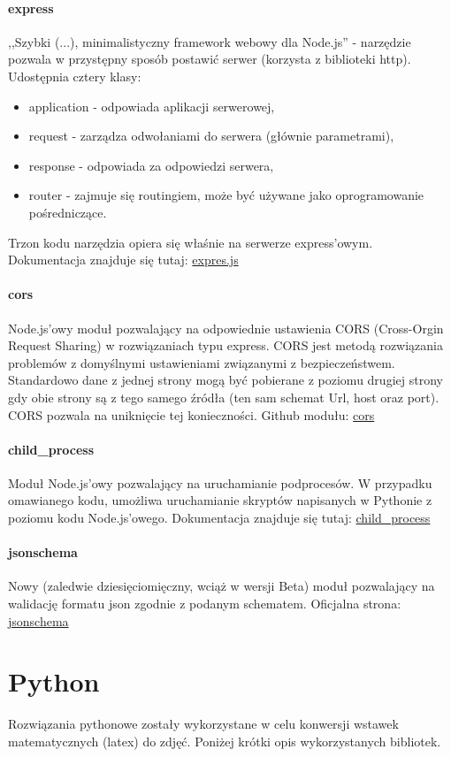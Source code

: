 \paragraph{express}
,,Szybki (...), minimalistyczny framework webowy dla Node.js'' - narzędzie pozwala w przystępny sposób postawić serwer (korzysta z biblioteki http). Udostępnia cztery klasy:
\begin{itemize}
\item application - odpowiada aplikacji serwerowej,
\item  request - zarządza odwołaniami do serwera (głównie parametrami),
\item response - odpowiada za odpowiedzi serwera,
\item router - zajmuje się routingiem, może być używane jako oprogramowanie pośredniczące.
\end{itemize}
Trzon kodu narzędzia opiera się właśnie na serwerze express'owym.
\ind Dokumentacja znajduje się tutaj: \href{https://expressjs.com/}{expres.js}
\paragraph{cors}
Node.js'owy moduł pozwalający na odpowiednie ustawienia CORS (Cross-Orgin Request Sharing) w rozwiązaniach typu express. CORS jest metodą rozwiązania problemów z domyślnymi ustawieniami związanymi z bezpieczeństwem. Standardowo dane z jednej strony mogą być pobierane z poziomu drugiej strony gdy obie strony są z tego samego źródła (ten sam schemat Url, host oraz port). CORS pozwala na uniknięcie tej konieczności.
\ind Github modułu: \href{https://github.com/expressjs/cors}{cors}
\paragraph{child\_process}
Moduł Node.js'owy pozwalający na uruchamianie podprocesów. W przypadku omawianego kodu, umożliwa uruchamianie skryptów napisanych  w Pythonie z poziomu kodu Node.js'owego.
\ind Dokumentacja znajduje się tutaj: \href{https://nodejs.org/api/child_process.html}{child\_process}
\paragraph{jsonschema}
\ind Nowy (zaledwie dziesięciomięczny, wciąż w wersji Beta) moduł pozwalający na walidację formatu json zgodnie z podanym schematem.
\ind Oficjalna strona: \href{https://www.npmjs.com/package/jsonschema}{jsonschema}

\section{Python}
Rozwiązania pythonowe zostały wykorzystane w celu konwersji wstawek matematycznych (latex) do zdjęć. Poniżej krótki opis wykorzystanych bibliotek.
